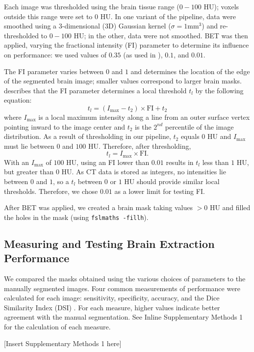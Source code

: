 Each image was thresholded using the brain tissue range ($0-100$ HU); voxels outside this range were set to $0$ HU.  In one variant of the pipeline, data were smoothed using a 3-dimensional (3D) Gaussian kernel ($\sigma=1$mm$^3$) and re-thresholded to $0-100$ HU; in the other, data were not smoothed.  BET was then applied, varying the fractional intensity (FI) parameter to determine its influence on performance: we used values of $0.35$ (as used in \citet{rorden_age-specific_2012}), $0.1$, and $0.01$.  

The FI parameter varies between $0$ and $1$ and determines the location of the edge of the segmented brain image; smaller values correspond to larger brain masks. \citet{smith_fast_2002} describes that the FI parameter determines a local threshold $t_{l}$ by the following equation:
$$
t_{l} = \left(I_{\text{max}} - t_2\right) \times \text{FI} + t_2
$$
where $I_{\text{max}}$ is a local maximum intensity along a line from an outer surface vertex pointing inward to the image center and $t_2$ is the $2^{nd}$ percentile of the image distribution.  As a result of thresholding in our pipeline, $t_2$ equals $0$ HU and $I_{\text{max}}$ must lie between $0$ and $100$ HU.  Therefore, after thresholding,
$$
t_{l} = I_{\text{max}} \times \text{FI}.
$$
With an $I_{\text{max}}$ of $100$ HU, using an FI lower than $0.01$ results in $t_{l}$ less than $1$ HU, but greater than $0$ HU.  As CT data is stored as integers, no intensities lie between $0$ and $1$, so a $t_{l}$ between $0$ or $1$ HU should provide similar local thresholds.  Therefore, we chose $0.01$ as a lower limit for testing FI. 


After BET was applied, we created a brain mask taking values $> 0$ HU and filled the holes in the mask (using \verb|fslmaths -fillh|).  


\subsection{Measuring and Testing Brain Extraction Performance}
We compared the masks obtained using the various choices of parameters to the manually segmented images.  Four common measurements of performance were calculated for each image: sensitivity, specificity, accuracy, and the Dice Similarity Index (DSI) \citep{dice_measures_1945}.  For each measure, higher values indicate better agreement with the manual segmentation.  See Inline Supplementary Methods 1 for the calculation of each measure.

[Insert Supplementary Methods 1 here]

